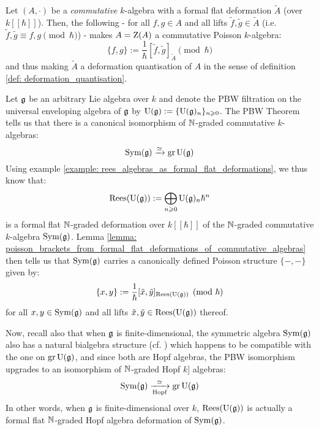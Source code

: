         \begin{corollary} \label{coro: deformation_quantisation_of_poisson_algebras_from_formal_flat_deformations}
            Let $(A, \cdot)$ be a \textit{commutative} $k$-algebra with a formal flat deformation $\tilde{A}$ (over $k[\![\hbar]\!]$). Then, the following - for all $f, g \in A$ and all lifts $\tilde{f}, \tilde{g} \in \tilde{A}$ (i.e. $\tilde{f}, \tilde{g} \equiv f, g \pmod{\hbar}$) - makes $A = \mathrm{Z}(A)$ a commutative Poisson $k$-algebra:
                $$\{f, g\} := \frac{1}{\hbar}[\tilde{f}, \tilde{g}]_{\tilde{A}} \pmod{\hbar}$$
            and thus making $\tilde{A}$ a deformation quantisation of $A$ in the sense of definition \ref{def: deformation_quantisation}.
        \end{corollary}
        \begin{example} \label{example: PBW_deformations}
            Let $\mathfrak{g}$ be an arbitrary Lie algebra over $k$ and denote the PBW filtration on the universal enveloping algebra of $\mathfrak{g}$ by $\mathrm{U}(\mathfrak{g}) := \{\mathrm{U}(\mathfrak{g})_n\}_{n \geqslant 0}$. The PBW Theorem tells us that there is a canonical isomorphism of $\mathbb{N}$-graded commutative $k$-algebras:
                $$\mathrm{Sym}(\mathfrak{g}) \xrightarrow[]{\simeq} \operatorname{gr} \mathrm{U}(\mathfrak{g})$$
            Using example \ref{example: rees_algebras_as_formal_flat_deformations}, we thus know that:
                $$\operatorname{Rees}(\mathrm{U}(\mathfrak{g})) := \bigoplus_{n \geqslant 0} \mathrm{U}(\mathfrak{g})_n \hbar^n$$
            is a formal flat $\mathbb{N}$-graded deformation over $k[\![\hbar]\!]$ of the $\mathbb{N}$-graded commutative $k$-algebra $\mathrm{Sym}(\mathfrak{g})$. Lemma \ref{lemma: poisson_brackets_from_formal_flat_deformations_of_commutative_algebras} then tells us that $\mathrm{Sym}(\mathfrak{g})$ carries a canonically defined Poisson structure $\{-, -\}$ given by:
                $$\{x, y\} := \frac{1}{\hbar}[\tilde{x}, \tilde{y}]_{\operatorname{Rees}(\mathrm{U}(\mathfrak{g}))} \pmod{\hbar}$$
            for all $x, y \in \mathrm{Sym}(\mathfrak{g})$ and all lifts $\tilde{x}, \tilde{y} \in \operatorname{Rees}(\mathrm{U}(\mathfrak{g}))$ thereof. 

            Now, recall also that when $\mathfrak{g}$ is finite-dimensional, the symmetric algebra $\mathrm{Sym}(\mathfrak{g})$ also has a natural bialgebra structure (cf. \cite[Chapter III]{kassel_quantum_groups}) which happens to be compatible with the one on $\operatorname{gr} \mathrm{U}(\mathfrak{g})$, and since both are Hopf algebras, the PBW isomorphism upgrades to an isomorphism of $\mathbb{N}$-graded Hopf $k$]
            algebras:
                $$\mathrm{Sym}(\mathfrak{g}) \xrightarrow[\text{Hopf}]{\simeq} \operatorname{gr} \mathrm{U}(\mathfrak{g})$$
            In other words, when $\mathfrak{g}$ is finite-dimensional over $k$, $\operatorname{Rees}(\mathrm{U}(\mathfrak{g}))$ is actually a formal flat $\mathbb{N}$-graded Hopf algebra deformation of $\mathrm{Sym}(\mathfrak{g})$. 
        \end{example}
    
